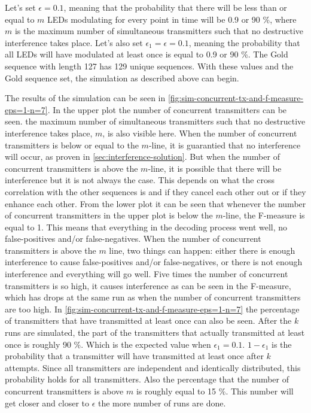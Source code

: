 Let's set $\epsilon = 0.1$, meaning that the probability that there will be less than or equal to $m$ LEDs modulating for every point in time will be 0.9 or 90 \%, where $m$ is the maximum number of simultaneous transmitters such that no destructive interference takes place.
Let's also set $\epsilon_1 = \epsilon = 0.1$, meaning the probability that all LEDs will have modulated at least once is equal to 0.9 or 90 \%.
The Gold sequence with length 127 has 129 unique sequences.
With these values and the Gold sequence set, the simulation as described above can begin. 



The results of the simulation can be seen in \autoref{fig:sim-concurrent-tx-and-f-measure-eps=1-n=7}.
In the upper plot the number of concurrent transmitters can be seen. 
the maximum number of simultaneous transmitters such that no destructive interference takes place, $m$, is also visible here.
When the number of concurrent transmitters is below or equal to the $m$-line, it is guarantied that no interference will occur, as proven in \autoref{sec:interference-solution}.
But when the number of concurrent transmitters is above the $m$-line, it is possible that there will be interference but it is not always the case.
This depends on what the cross correlation with the other sequences is and if they cancel each other out or if they enhance each other.
From the lower plot it can be seen that whenever the number of concurrent transmitters in the upper plot is below the $m$-line, the F-measure is equal to 1.
This means that everything in the decoding process went well, no false-positives and/or false-negatives.
When the number of concurrent transmitters is above the $m$ line, two things can happen: either there is enough interference to cause false-positives and/or false-negatives, or there is not enough interference and everything will go well.
Five times the number of concurrent transmitters is so high, it causes interference as can be seen in the F-measure, which has drops at the same run as when the number of concurrent transmitters are too high.
In \autoref{fig:sim-concurrent-tx-and-f-measure-eps=1-n=7} the percentage of transmitters that have transmitted at least once can also be seen.
After the $k$ runs are simulated, the part of the transmitters that actually transmitted at least once is roughly 90 \%.
Which is the expected value when $\epsilon_1 = 0.1$.
$1 - \epsilon_1$ is the probability that a transmitter will have transmitted at least once after $k$ attempts.
Since all transmitters are independent and identically distributed, this probability holds for all transmitters.
Also the percentage that the number of concurrent transmitters is above $m$ is roughly equal to 15 \%.
This number will get closer and closer to $\epsilon$ the more number of runs are done.





